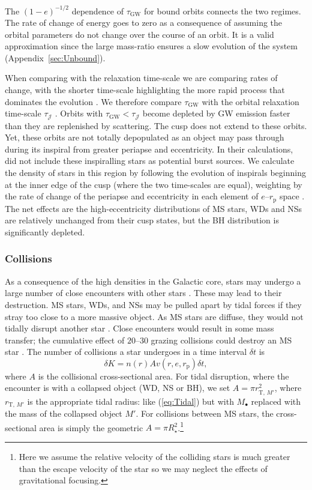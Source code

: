 \documentclass[useAMS,usedcolumn,usegraphicx,usenatbib]{mn2e}
\newcommand{\eqnref}[1]{(\ref{eq:#1})}
\newcommand{\apref}[1]{Appendix~\ref{sec:#1}}
\newcommand{\sub}[1]{\ensuremath{_\mathrm{#1}}}
\begin{document}
The $(1-e)^{-1/2}$ dependence of $\tau\sub{GW}$ for bound orbits connects the two regimes. The rate of change of energy goes to zero as a consequence of assuming the orbital parameters do not change over the course of an orbit. It is a valid approximation since the large mass-ratio ensures a slow evolution of the system (\apref{Unbound}).

When comparing with the relaxation time-scale we are comparing rates of change, with the shorter time-scale highlighting the more rapid process that dominates the evolution \citep{Amaro-Seoane2007}. We therefore compare $\tau\sub{GW}$ with the orbital relaxation time-scale $\tau_\mathcal{J}$ \citep{Merritt2011}. Orbits with $\tau\sub{GW} < \tau_\mathcal{J}$ become depleted by GW emission faster than they are replenished by scattering. The cusp does not extend to these orbits. Yet, these orbits are not totally depopulated as an object may pass through during its inspiral from greater periapse and eccentricity. In their calculations, \citet{Hopman2007} did not include these inspiralling stars as potential burst sources. We calculate the density of stars in this region by following the evolution of inspirals beginning at the inner edge of the cusp (where the two time-scales are equal), weighting by the rate of change of the periapse and eccentricity in each element of $e$--$r\sub{p}$ space \citep{Peters1964}. The net effects are the high-eccentricity distributions of MS stars, WDs and NSs are relatively unchanged from their cusp states, but the BH distribution is significantly depleted.

\subsubsection{Collisions}\label{sec:Collision}

As a consequence of the high densities in the Galactic core, stars may undergo a large number of close encounters with other stars \citep{Cohn1978}. These may lead to their destruction. MS stars, WDs, and NSs may be pulled apart by tidal forces if they stray too close to a more massive object. As MS stars are diffuse, they would not tidally disrupt another star \citep{Murphy1991,Freitag2005}. Close encounters would result in some mass transfer; the cumulative effect of $20$--$30$ grazing collisions could destroy an MS star \citep{Freitag2006}. The number of collisions a star undergoes in a time interval $\delta t$ is
\begin{equation}
\delta K = n(r) A v(r,e,r\sub{p})\delta t,
\end{equation}
where $A$ is the collisional cross-sectional area. For tidal disruption, where the encounter is with a collapsed object (WD, NS or BH), we set $A = \pi r_{\mathrm{T},\,{M'}}^2$, where $r_{\mathrm{T},\,{M'}}$ is the appropriate tidal radius: like \eqnref{Tidal} but with $M_\bullet$ replaced with the mass of the collapsed object $M'$. For collisions between MS stars, the cross-sectional area is simply the geometric $A = \pi R_\star^2$.\footnote{Here we assume the relative velocity of the colliding stars is much greater than the escape velocity of the star so we may neglect the effects of gravitational focusing.}
\end{document}
